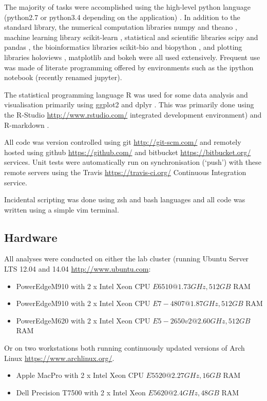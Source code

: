 The majority of tasks were accomplished using the high-level python language (python2.7 or python3.4
depending on the application) \citep{}.  In addition to the standard library, the numerical
computation libraries numpy \citep{} and theano \citep{}, machine learning library scikit-learn \citep{},
statistical and scientific libraries scipy \citep{} and pandas \citep{}, the bioinformatics libraries
scikit-bio \citep{} and biopython \citep{}, and plotting libraries holoviews \citep{}, 
matplotlib \citep{} and bokeh \citep{} were all used extensively.
Frequent use was made of literate programming offered by environments such as the ipython notebook (recently
renamed jupyter).

The statistical programming language R \citep{RCoreTeam2015} was used for some data analysis
and visualisation primarily using ggplot2 \citep{Wickham2009} and dplyr \citep{Wickham2014}.
This was primarily done using the R-Studio \url{http://www.rstudio.com/} integrated development environment) and 
R-markdown \citep{Allaire2014}.

All code was version controlled using git \url{http://git-scm.com/} and remotely hosted using github \url{https://github.com/} and bitbucket \url{https://bitbucket.org/} 
services.  Unit tests were automatically run on synchronisation (`push') with these remote servers using 
the Travis \url{https://travis-ci.org/} Continuous Integration service.

Incidental scripting was done using zsh and bash languages and all code was written using a simple vim terminal.

\subsection{Hardware}

All analyses were conducted on either the lab cluster (running Ubuntu Server LTS 12.04 and 14.04 \url{http://www.ubuntu.com}:
\begin{itemize} 
    \item PowerEdgeM910 with 2 x Intel Xeon CPU \(E6510 @ 1.73GHz, 512GB\) RAM
    \item PowerEdgeM910 with 2 x Intel Xeon CPU \(E7-4807 @ 1.87GHz, 512GB\) RAM
    \item PowerEdgeM620 with 2 x Intel Xeon CPU \(E5-2650 v2 @ 2.60GHz, 512GB\) RAM
\end{itemize}
Or on two workstations both running continuously updated versions of Arch Linux \url{https://www.archlinux.org/}.
\begin{itemize}
    \item Apple MacPro with 2 x Intel Xeon CPU \(E5520 @ 2.27GHz, 16GB\) RAM
    \item Dell Precision T7500 with 2 x Intel Xeon \(E5620 @ 2.4GHz, 48GB\) RAM
\end{itemize}
